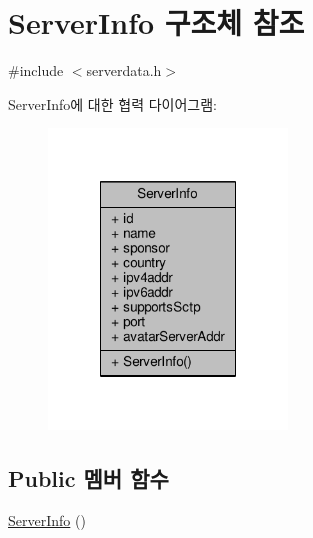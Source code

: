 \hypertarget{struct_server_info}{\section{Server\-Info 구조체 참조}
\label{struct_server_info}
}


{\ttfamily \#include $<$serverdata.\-h$>$}



Server\-Info에 대한 협력 다이어그램\-:\nopagebreak
\begin{figure}[H]
\begin{center}
\leavevmode
\includegraphics[width=180pt]{struct_server_info__coll__graph}
\end{center}
\end{figure}
\subsection*{Public 멤버 함수}
\begin{DoxyCompactItemize}
\item 
\hyperlink{struct_server_info_a7627924fa461528a5c0a13b105499410}{Server\-Info} ()
\end{DoxyCompactItemize}
